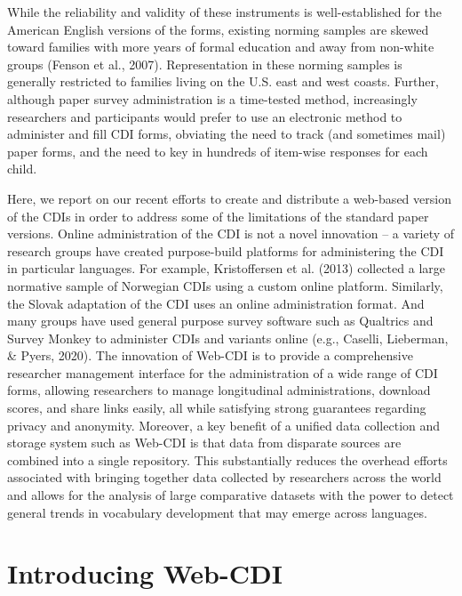 \documentclass[
  english,
  ,man,floatsintext]{apa6}
\begin{document}
While the reliability and validity of these instruments is well-established for the American English versions of the forms, existing norming samples are skewed toward families with more years of formal education and away from non-white groups (Fenson et al., 2007). Representation in these norming samples is generally restricted to families living on the U.S. east and west coasts. Further, although paper survey administration is a time-tested method, increasingly researchers and participants would prefer to use an electronic method to administer and fill CDI forms, obviating the need to track (and sometimes mail) paper forms, and the need to key in hundreds of item-wise responses for each child.

Here, we report on our recent efforts to create and distribute a web-based version of the CDIs in order to address some of the limitations of the standard paper versions. Online administration of the CDI is not a novel innovation -- a variety of research groups have created purpose-build platforms for administering the CDI in particular languages. For example, Kristoffersen et al. (2013) collected a large normative sample of Norwegian CDIs using a custom online platform. Similarly, the Slovak adaptation of the CDI uses an online administration format. And many groups have used general purpose survey software such as Qualtrics and Survey Monkey to administer CDIs and variants online (e.g., Caselli, Lieberman, \& Pyers, 2020). The innovation of Web-CDI is to provide a comprehensive researcher management interface for the administration of a wide range of CDI forms, allowing researchers to manage longitudinal administrations, download scores, and share links easily, all while satisfying strong guarantees regarding privacy and anonymity. Moreover, a key benefit of a unified data collection and storage system such as Web-CDI is that data from disparate sources are combined into a single repository. This substantially reduces the overhead efforts associated with bringing together data collected by researchers across the world and allows for the analysis of large comparative datasets with the power to detect general trends in vocabulary development that may emerge across languages.

\hypertarget{introducing-web-cdi}{%
\section{Introducing Web-CDI}\label{introducing-web-cdi}}
\end{document}
